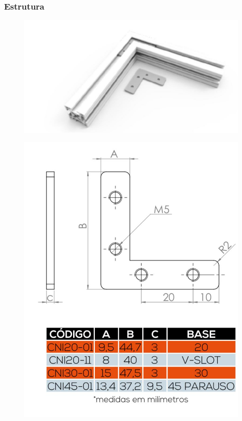 \begin{frame}
\frametitle{Estrutura}

\begin{figure}
\centering
\includegraphics[scale = 0.15]{figs/pconexao90p}
\end{figure}

\begin{figure}
\centering
\includegraphics[scale = 0.15]{figs/pconexao90d}
\end{figure}
    
\end{frame}

